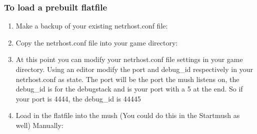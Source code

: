 \documentclass[letterpaper,10pt,english]{sphinxmanual}
\begin{document}
\subsubsection{To load a prebuilt flatfile}
\label{\detokenize{install:to-load-a-prebuilt-flatfile}}\begin{enumerate}
%
\item {} 
\sphinxAtStartPar
Make a backup of your existing netrhost.conf file:

\begin{sphinxVerbatim}[commandchars=\\\{\}]
  
\end{sphinxVerbatim}

\item {} 
\sphinxAtStartPar
Copy the netrhost.conf file into your game directory:

\begin{sphinxVerbatim}[commandchars=\\\{\}]
   
\end{sphinxVerbatim}

\item {} 
\sphinxAtStartPar
At this point you can modify your netrhost.conf file settings in your game directory.
Using an editor modify the \textquotesingle{}port\textquotesingle{} and \textquotesingle{}debug\_id\textquotesingle{} respectively in your netrhost.conf as state.
The \textquotesingle{}port\textquotesingle{} will be the port the mush listens on, the debug\_id is for the debug\sphinxhyphen{}stack and is
your port with a \textquotesingle{}5\textquotesingle{} at the end.  So if your port is 4444, the debug\_id is 44445

\item {} 
\sphinxAtStartPar
Load in the flatfile into the mush (You could do this in the Startmush as well)
Manually:

\begin{sphinxVerbatim}[commandchars=\\\{\}]
 
\end{sphinxVerbatim}


\end{enumerate}
\end{document}
